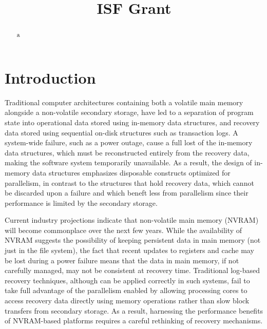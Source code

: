 \documentclass{article}
\title{ISF Grant}
\author{}
\begin{document}
\maketitle

\begin{abstract}
	a
\end{abstract}

\section{Introduction}

Traditional computer architectures containing both a volatile main memory alongside a non-volatile secondary storage, have led to a separation of program state into operational data stored using in-memory data structures, and recovery data stored using sequential on-disk structures such as transaction logs. A system-wide failure, such as a power outage, cause a full lost of the in-memory data structures, which must be reconstructed entirely from the recovery data, making the software system temporarily unavailable. As a result, the design of in-memory data structures emphasizes disposable constructs optimized for parallelism, in contrast to the structures that hold recovery data, which cannot be discarded upon a failure and which beneft less from parallelism since their performance is limited by the secondary storage.

Current industry projections indicate that non-volatile main memory (NVRAM) will become commonplace over the next few years. While the availability of NVRAM suggests the possibility of keeping persistent data in main memory (not just in the file system), the fact that recent updates to registers and cache may be lost during a power failure means that the data in main memory, if not carefully managed, may not be consistent at recovery time.
Traditional log-based recovery techniques, although can be applied correctly in such systems, fail to take full advantage of the parallelism enabled by allowing processing cores to access recovery data directly using memory operations rather than slow block transfers from secondary storage. As a result, harnessing the performance benefits of NVRAM-based platforms requires a careful rethinking of recovery mechanisms.
\end{document}
